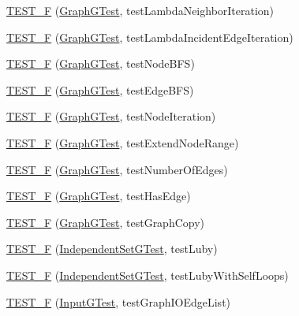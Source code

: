\begin{DoxyCompactItemize}
\item 
\hyperlink{namespace_networ_kit_a2538cc231cd7f2daf364b5c1fb563c3f}{T\-E\-S\-T\-\_\-\-F} (\hyperlink{class_networ_kit_1_1_graph_g_test}{Graph\-G\-Test}, test\-Lambda\-Neighbor\-Iteration)
\item 
\hyperlink{namespace_networ_kit_a7226a1f21249d48c76c0e398968ac77b}{T\-E\-S\-T\-\_\-\-F} (\hyperlink{class_networ_kit_1_1_graph_g_test}{Graph\-G\-Test}, test\-Lambda\-Incident\-Edge\-Iteration)
\item 
\hyperlink{namespace_networ_kit_a612aaf58f0fb25ba9a3857d6d7a368c5}{T\-E\-S\-T\-\_\-\-F} (\hyperlink{class_networ_kit_1_1_graph_g_test}{Graph\-G\-Test}, test\-Node\-B\-F\-S)
\item 
\hyperlink{namespace_networ_kit_a204895d4541cc1cf8e6891d6198c1187}{T\-E\-S\-T\-\_\-\-F} (\hyperlink{class_networ_kit_1_1_graph_g_test}{Graph\-G\-Test}, test\-Edge\-B\-F\-S)
\item 
\hyperlink{namespace_networ_kit_a4fe0b90775e29a85e72fa489e07c9613}{T\-E\-S\-T\-\_\-\-F} (\hyperlink{class_networ_kit_1_1_graph_g_test}{Graph\-G\-Test}, test\-Node\-Iteration)
\item 
\hyperlink{namespace_networ_kit_a6436782f27d5fc385ed2f5ee4b64431b}{T\-E\-S\-T\-\_\-\-F} (\hyperlink{class_networ_kit_1_1_graph_g_test}{Graph\-G\-Test}, test\-Extend\-Node\-Range)
\item 
\hyperlink{namespace_networ_kit_a4b9bf497a86a3e718747ba7c032d0e04}{T\-E\-S\-T\-\_\-\-F} (\hyperlink{class_networ_kit_1_1_graph_g_test}{Graph\-G\-Test}, test\-Number\-Of\-Edges)
\item 
\hyperlink{namespace_networ_kit_a29e5f774818257727d964f7f87c615f4}{T\-E\-S\-T\-\_\-\-F} (\hyperlink{class_networ_kit_1_1_graph_g_test}{Graph\-G\-Test}, test\-Has\-Edge)
\item 
\hyperlink{namespace_networ_kit_a74c614150184a67e72ddae02ba6611f5}{T\-E\-S\-T\-\_\-\-F} (\hyperlink{class_networ_kit_1_1_graph_g_test}{Graph\-G\-Test}, test\-Graph\-Copy)
\item 
\hyperlink{namespace_networ_kit_a4fc0bfd7f1d51fb53b57d971efdd5b7a}{T\-E\-S\-T\-\_\-\-F} (\hyperlink{class_networ_kit_1_1_independent_set_g_test}{Independent\-Set\-G\-Test}, test\-Luby)
\item 
\hyperlink{namespace_networ_kit_adbe4aeb718867f6f04e5f9b7c8f7cc38}{T\-E\-S\-T\-\_\-\-F} (\hyperlink{class_networ_kit_1_1_independent_set_g_test}{Independent\-Set\-G\-Test}, test\-Luby\-With\-Self\-Loops)
\item 
\hyperlink{namespace_networ_kit_adc6014d7776384a91125e1adfc6821d1}{T\-E\-S\-T\-\_\-\-F} (\hyperlink{class_networ_kit_1_1_input_g_test}{Input\-G\-Test}, test\-Graph\-I\-O\-Edge\-List)

\end{DoxyCompactItemize}
